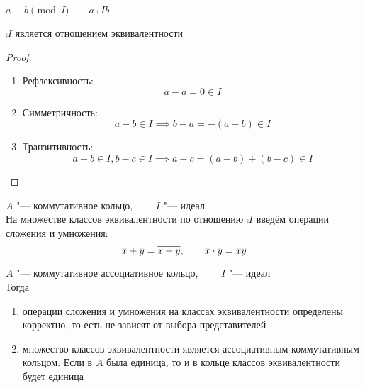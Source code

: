 \begin{notation}
	$ a \equiv b \pmod I \qquad a \comp{I} b $
\end{notation}

\begin{property}
	$ \comp{I} $ является отношением эквивалентности
\end{property}

\begin{proof}
	\hfill
	\begin{enumerate}
		\item Рефлексивность:
		$$ a - a = 0 \in I $$
		\item Симметричность:
		$$ a - b \in I \implies b - a = -(a - b) \in I $$
		\item Транзитивность:
		$$ a - b \in I, b - c \in I \implies a - c = (a - b) + (b - c) \in I $$
	\end{enumerate}
\end{proof}

\begin{definition}
	$ A $ "--- коммутативное кольцо, $ \qquad I $ "--- идеал \\
	На множестве классов эквивалентности по отношению $ \comp{I} $ введём операции сложения и умножения:
	$$ \overline{x} + \overline{y} = \overline{x + y}, \qquad \overline{x} \cdot \overline{y} = \overline{xy} $$
\end{definition}

\begin{theorem}[факторкольцо]
	$ A $ "--- коммутативное ассоциативное кольцо, $ \qquad I $ "--- идеал \\
	Тогда
	\begin{enumerate}
		\item операции сложения и умножения на классах эквивалентности определены корректно, то есть не зависят от выбора представителей

		\item множество классов эквивалентности является ассоциативным коммутативным кольцом. Если в $ A $ была единица, то и в кольце классов эквивалентности будет единица
	\end{enumerate}
\end{theorem}


